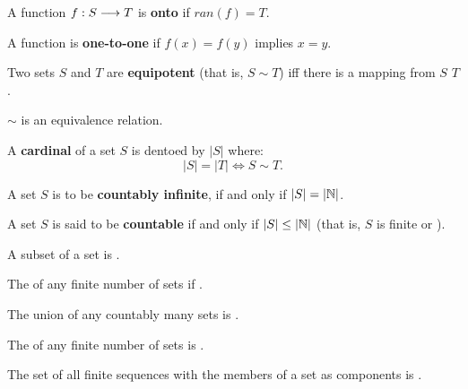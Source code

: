 \documentclass[english, 11pt]{article}
\begin{document}
  \begin{defn}[onto]\label{onto}
  A function $f : S \longrightarrow T$ is \textbf{onto} if $ran(f) = T$.
  \end{defn}
  \begin{defn}\label{one-to-one}
  A function is \textbf{one-to-one} if $f(x) = f(y)$ implies $x = y$.
  \end{defn}
  \begin{defn}[equipotent]\label{equipotent}
  Two sets $S$ and $T$ are \textbf{equipotent} (that is, $S \sim T$) iff there is a  mapping from $S$  $T$.
  \end{defn}
  $\sim$ is an equivalence relation.
  \begin{defn}[cardinal]\label{cardinal}
  A \textbf{cardinal} of a set $S$ is dentoed by $|S|$ where:
  \[ |S| = |T| \iff S \sim T. \]
  \end{defn}
  \begin{defn}\label{countablyinfinite}
  A set $S$ is to be \textbf{countably infinite}, if and only if $|S| = |{\mathbb{N}}|$.
  \end{defn}
  \begin{defn}[countable]\label{countable}
  A set $S$ is said to be \textbf{countable} if and only if $|S| \leq |{\mathbb{N}}|$ (that is, $S$ is finite or ).
  \end{defn}
  \begin{thrm}\label{subsetcountablecountable}
  A subset of a  set is .
  \end{thrm}
  \begin{thrm}\label{unionfinitecountable}
    The  of any finite number of  sets if .
  \end{thrm}
  \begin{thrm}\label{unioncountablecountable}
    The union of any countably many  sets is .
  \end{thrm}
  \begin{thrm}\label{cartesianfinitecountable}
    The  of any finite number of  sets is .
  \end{thrm}
  \begin{thrm}\label{allfinitemembercountable}
   The set of all finite sequences with the members of a  set as components is .
  \end{thrm}
\end{document}
